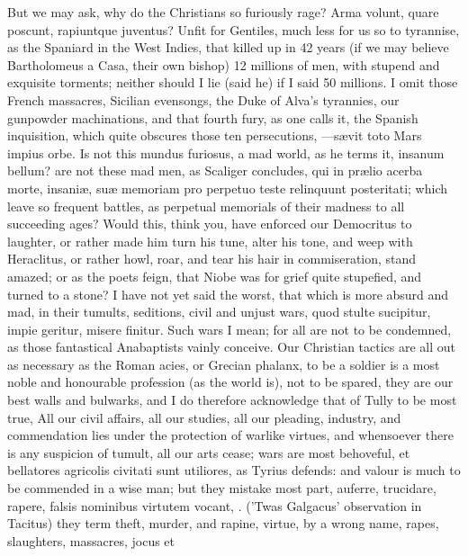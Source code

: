 {But we may ask, why do the Christians so furiously rage? Arma
volunt, quare poscunt, rapiuntque juventus? Unfit for Gentiles, much
less for us so to tyrannise, as the Spaniard in the West Indies, that
killed up in 42 years (if we may believe Bartholomeus a Casa,
their own bishop) 12 millions of men, with stupend and exquisite
torments; neither should I lie (said he) if I said 50 millions. I omit
those French massacres, Sicilian evensongs, the Duke of Alva's
tyrannies, our gunpowder machinations, and that fourth fury, as
one calls it, the Spanish inquisition, which quite obscures those
ten persecutions, ---s\ae{}vit toto Mars impius orbe. Is not this
mundus furiosus, a mad world, as he terms it, insanum bellum? are
not these mad men, as Scaliger concludes, qui in pr\ae{}lio acerba
morte, insani\ae{}, su\ae{} memoriam pro perpetuo teste relinquunt
posteritati; which leave so frequent battles, as perpetual memorials of
their madness to all succeeding ages? Would this, think you, have
enforced our Democritus to laughter, or rather made him turn his tune,
alter his tone, and weep with Heraclitus, or rather howl,
roar, and tear his hair in commiseration, stand amazed; or as the
poets feign, that Niobe was for grief quite stupefied, and turned to a
stone? I have not yet said the worst, that which is more absurd and
mad, in their tumults, seditions, civil and unjust wars, quod
stulte sucipitur, impie geritur, misere finitur. Such wars I mean; for
all are not to be condemned, as those fantastical Anabaptists vainly
conceive. Our Christian tactics are all out as necessary as the Roman
acies, or Grecian phalanx, to be a soldier is a most noble and
honourable profession (as the world is), not to be spared, they are our
best walls and bulwarks, and I do therefore acknowledge that of
Tully to be most true, All our civil affairs, all our studies, all
our pleading, industry, and commendation lies under the protection of
warlike virtues, and whensoever there is any suspicion of tumult, all
our arts cease; wars are most behoveful, et bellatores agricolis
civitati sunt utiliores, as Tyrius defends: and valour is much to
be commended in a wise man; but they mistake most part, auferre,
trucidare, rapere, falsis nominibus virtutem vocant, \etc{}. ('Twas
Galgacus' observation in Tacitus) they term theft, murder, and rapine,
virtue, by a wrong name, rapes, slaughters, massacres, \etc{} jocus et
}
